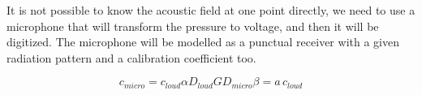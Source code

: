 It is not possible to know the acoustic field at one point directly, we need to use a microphone that will transform the pressure to voltage, and then it will be digitized. The microphone will be modelled as a punctual receiver with a given radiation pattern and a calibration coefficient too.

%

\begin{equation}
c_\mathit{micro} = c_\mathit{loud} \alpha D_{loud} G D_{micro} \beta = a \, c_\mathit{loud}
\label{transEquationCalibration}
\end{equation}

